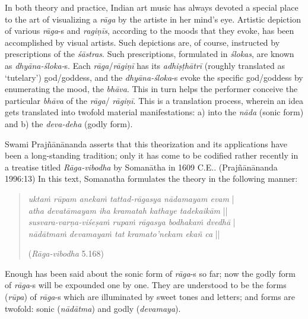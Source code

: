 In both theory and practice, Indian art music has always devoted a special place to the art of visualizing a \textsl{rāga} by the artiste in her mind’s eye. Artistic depiction of various \textsl{rāga}-s and \textsl{ragiṇīs}, according to the moods that they evoke, has been accomplished by visual artists. Such depictions are, of course, instructed by prescriptions of the \textsl{śāstras}. Such prescriptions, formulated in \textsl{ślokas}, are known as \textsl{dhyāna-śloka-}s. Each \textsl{rāga}/\textsl{rāgiṇī} has its \textsl{adhiṣṭhātrī} (roughly translated as ‘tutelary’) god/goddess, and the \textsl{dhyāna-śloka}-s evoke the specific god/goddess by enumerating the mood, the \textsl{bhāva}. This in turn helps the performer conceive the particular \textsl{bhāva} of the \textsl{rāga}/ \textsl{rāgiṇī}. This is a translation process, wherein an idea gets translated into twofold material manifestations: a) into the \textsl{nāda} (sonic form) and b) the \textsl{deva-deha} (godly form).

Swami Prajñānānanda asserts that this theorization and its applications have been a long-standing tradition; only it has come to be codified rather recently in a treatise titled \textsl{Rāga-vibodha} by Somanātha in 1609 C.E.. (Prajñānānanda 1996:13) In this text, Somanatha formulates the theory in the following manner:
\begin{quote}
\textsl{uktaṁ rūpam anekaṁ tattad-rāgasya nādamayam evam} |\\
\textsl{atha devatāmayam iha kramatah kathaye tadekaikām} ||\\
\textsl{susvara-varṇa-viśeṣaṁ rupaṁ rāgasya bodhakaṁ dvedhā} |\\
\textsl{nādātmaṁ devamayaṁ tat kramato’nekam ekañ ca} || 

\hfill (\textsl{Rāga-vibodha} 5.168)
\end{quote}

Enough has been said about the sonic form of \textsl{rāga}-s so far; now the godly form of \textsl{rāga}-s will be expounded one by one. They are understood to be the forms (\textsl{rūpa}) of \hbox{\textsl{rāga}-s} which are illuminated by sweet tones and letters; and forms are twofold: sonic (\textsl{nādātma}) and godly (\textsl{devamaya}). 

